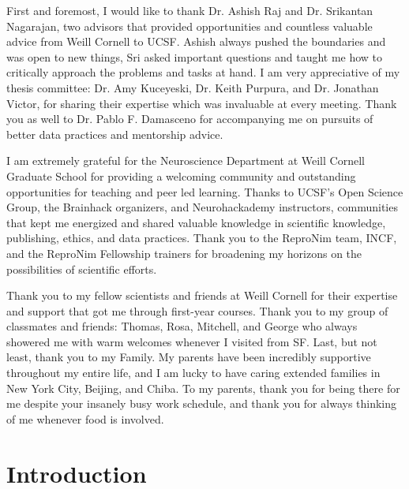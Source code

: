 \documentclass[phd,tocprelim]{cornell}
\begin{document}
\begin{acknowledgements}
First and foremost, I would like to thank Dr. Ashish Raj and Dr. Srikantan Nagarajan, two advisors that provided opportunities and countless valuable advice from Weill Cornell to UCSF. Ashish always pushed the boundaries and was open to new things, Sri asked important questions and taught me how to critically approach the problems and tasks at hand. I am very appreciative of my thesis committee: Dr. Amy Kuceyeski, Dr. Keith Purpura, and Dr. Jonathan Victor, for sharing their expertise which was invaluable at every meeting. Thank you as well to Dr. Pablo F. Damasceno for accompanying me on pursuits of better data practices and mentorship advice.

I am extremely grateful for the Neuroscience Department at Weill Cornell Graduate School for providing a welcoming community and outstanding opportunities for teaching and peer led learning. Thanks to UCSF's Open Science Group, the Brainhack organizers, and Neurohackademy instructors, communities that kept me energized and shared valuable knowledge in scientific knowledge, publishing, ethics, and data practices. Thank you to the ReproNim team, INCF, and the ReproNim Fellowship trainers for broadening my horizons on the possibilities of scientific efforts. 

Thank you to my fellow scientists and friends at Weill Cornell for their expertise and support that got me through first-year courses. Thank you to my group of classmates and friends: Thomas, Rosa, Mitchell, and George who always showered me with warm welcomes whenever I visited from SF. Last, but not least, thank you to my Family. My parents have been incredibly supportive throughout my entire life, and I am lucky to have caring extended families in New York City, Beijing, and Chiba. To my parents, thank you for being there for me despite your insanely busy work schedule, and thank you for always thinking of me whenever food is involved.  
\end{acknowledgements}

\contentspage
\tablelistpage
\figurelistpage

\normalspacing \setcounter{page}{1} 
\pagestyle{cornell} \addtolength{\parskip}{0.5\baselineskip}

\chapter{Introduction}

\end{document}
